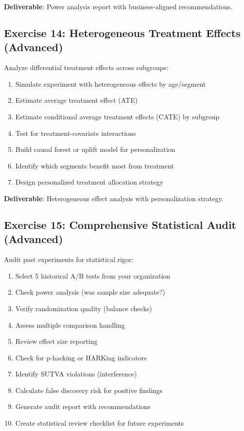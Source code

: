 \textbf{Deliverable}: Power analysis report with business-aligned recommendations.

\subsection{Exercise 14: Heterogeneous Treatment Effects (Advanced)}

Analyze differential treatment effects across subgroups:

\begin{enumerate}
    \item Simulate experiment with heterogeneous effects by age/segment
    \item Estimate average treatment effect (ATE)
    \item Estimate conditional average treatment effects (CATE) by subgroup
    \item Test for treatment-covariate interactions
    \item Build causal forest or uplift model for personalization
    \item Identify which segments benefit most from treatment
    \item Design personalized treatment allocation strategy
\end{enumerate}

\textbf{Deliverable}: Heterogeneous effect analysis with personalization strategy.

\subsection{Exercise 15: Comprehensive Statistical Audit (Advanced)}

Audit past experiments for statistical rigor:

\begin{enumerate}
    \item Select 5 historical A/B tests from your organization
    \item Check power analysis (was sample size adequate?)
    \item Verify randomization quality (balance checks)
    \item Assess multiple comparison handling
    \item Review effect size reporting
    \item Check for p-hacking or HARKing indicators
    \item Identify SUTVA violations (interference)
    \item Calculate false discovery risk for positive findings
    \item Generate audit report with recommendations
    \item Create statistical review checklist for future experiments
\end{enumerate}

